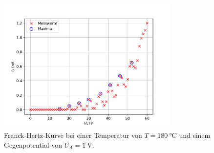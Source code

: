 \begin{figure}
    \centering
    \includegraphics[width=0.8\textwidth]{content/data/franck_hertz.pdf}
    \caption{Franck-Hertz-Kurve bei einer Temperatur von $T = \SI{180}{\degreeCelsius}$ und einem Gegenpotential von $U_A = \SI{1}{\volt}$. \cite{matplotlib}\cite{scipy}\cite{uncertainties}\cite{numpy}}
    \label{fig:franck_hertz}
\end{figure}

